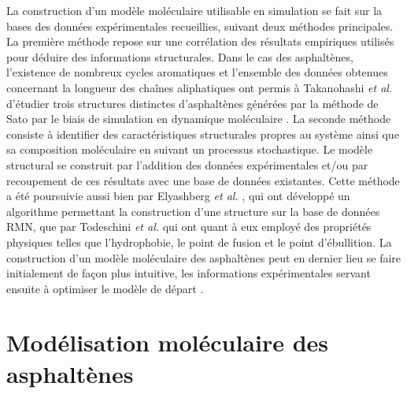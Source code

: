 	La construction d'un modèle moléculaire utilisable en simulation se fait sur la bases des données expérimentales recueillies, suivant deux méthodes principales. 
	La première méthode repose sur une corrélation des résultats empiriques utilisés pour déduire des informations structurales. Dans le cas des asphaltènes, l'existence de nombreux cycles aromatiques et l'ensemble des données obtenues concernant la longueur des chaînes aliphatiques ont permis à Takanohashi \textit{et al.} d'étudier trois structures distinctes d'asphaltènes générées par la méthode de Sato par le biais de simulation en dynamique moléculaire \cite{takanohashi2004structural}. 
	La seconde méthode consiste à identifier des caractéristiques structurales propres au système ainsi que sa composition moléculaire en suivant un processus stochastique. Le modèle structural se construit par l'addition des données expérimentales et/ou par recoupement de ces résultats avec une base de données existantes. Cette méthode a été poursuivie aussi bien par Elyashberg \textit{et al.} \cite{elyashberg2008computer}, qui ont développé un algorithme permettant la construction d'une structure sur la base de données RMN, que par Todeschini \textit{et al.} \cite{todeschini1995weighted} qui ont quant à eux employé des propriétés physiques telles que l'hydrophobie, le point de fusion et le point d'ébullition. 
	La construction d'un modèle moléculaire des asphaltènes peut en dernier lieu se faire initialement de façon plus intuitive, les informations expérimentales servant ensuite à optimiser le modèle de départ \cite{faulon1996stochastic,al2012systematic,de2012monte}. 
	
	
	
	\bigskip
	
	\section{Modélisation moléculaire des asphaltènes}
	
